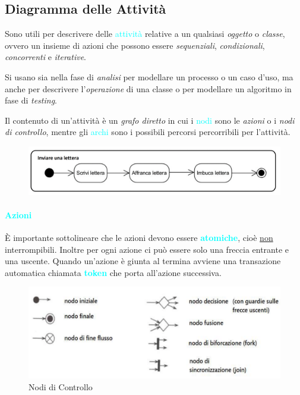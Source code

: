 \newline
\subsection{Diagramma delle Attività}
Sono utili per descrivere delle \textcolor{cyan}{attività} relative a un qualsiasi \emph{oggetto} o \emph{classe}, ovvero un insieme di azioni che possono essere \emph{sequenziali},
\emph{condizionali}, \emph{concorrenti} e \emph{iterative}.

Si usano sia nella fase di \emph{analisi} per modellare un processo o un caso d'uso,
ma anche per descrivere l'\emph{operazione} di una classe o per modellare un algoritmo in
fase di \emph{testing}.

Il contenuto di un'attività è un \emph{grafo diretto} in cui i \textcolor{cyan}{nodi} sono
le \emph{azioni} o i \emph{nodi di controllo}, mentre gli \textcolor{cyan}{archi} sono i possibili
percorsi percorribili per l'attività.

\begin{figure}[h]
    \centering
    \includegraphics[scale=0.34]{img/azione.png}
\end{figure}

\paragraph{\textcolor{cyan}{Azioni}} È importante sottolineare che le azioni devono essere
\textbf{\textcolor{cyan}{atomiche}}, cioè \underline{non} interrompibili.
Inoltre per ogni azione ci può essere solo una freccia entrante e una uscente.
Quando un'azione è giunta al termina avviene una transazione automatica chiamata
\textbf{\textcolor{cyan}{token}} che porta all'azione successiva.

\begin{figure}[h]
    \centering
    \includegraphics[scale=0.30]{img/nodidecisione.png}
    \caption{Nodi di Controllo}
\end{figure}

